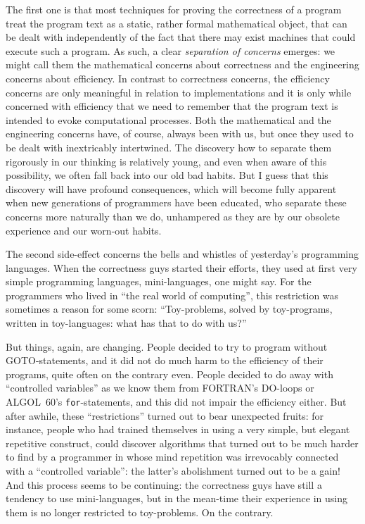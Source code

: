 \documentclass[12pt,letterpaper]{article}
\newcommand{\acro}[1]{{\small\MakeUppercase{#1}\spacefactor1000}}
\begin{document}
The first one is that most techniques for 
proving the correctness of a program treat the 
program text as a static, rather formal mathematical object, that can be dealt
with independently of the fact that there may exist machines that could execute
such a program. As such, a clear 
\emph{separation of concerns} emerges: we might call them 
the mathematical concerns about correctness and 
the engineering concerns about efficiency. In 
contrast to correctness concerns, the efficiency 
concerns are only meaningful in relation to implementations and it is only while concerned with 
efficiency that we need to remember that the program text is intended to evoke
computational processes. Both the mathematical and the engineering concerns
have, of course, always been with us, but 
once they used to be dealt with inextricably intertwined. The discovery how to
separate them rigorously in our thinking is relatively young, and even when
aware of this possibility, we often fall back 
into our old bad habits. But I guess that this 
discovery will have profound consequences, which 
will become fully apparent when new generations of 
programmers have been educated, who separate these 
concerns more naturally than we do, unhampered as 
they are by our obsolete experience and our worn-out habits. 

The second side-effect concerns the bells and 
whistles of yesterday's programming languages. When 
the correctness guys started their efforts, they 
used at first very simple programming languages, 
mini-languages, one might say. For the programmers 
who lived in ``the real world of computing'', this 
restriction was sometimes a reason for some scorn: 
``Toy-problems, solved by toy-programs, written in 
toy-languages: what has that to do with us?''

But things, again, are changing. People decided to try to program without
\acro{GOTO}-statements, and it did not do much harm to the efficiency of their
programs, quite often on the contrary even. People decided to do away with
``controlled variables'' as we know them from \acro{FORTRAN}'s \acro{DO}-loops or \acro{ALGOL}~60's
\texttt{for}-statements, and this did not impair the efficiency either. But after
awhile, these ``restrictions'' turned out to bear unexpected fruits: for
instance, people who had trained themselves in using a very simple, but elegant
repetitive construct, could discover algorithms that turned out to be much
harder to find by a programmer in whose mind repetition was irrevocably
connected with a ``controlled variable'': the latter's abolishment turned out to
be a gain! And this process seems to be continuing: the correctness guys have
still a tendency to use mini-languages, but in the mean-time their experience in
using them is no longer restricted to toy-problems. On the contrary. 
\end{document}
